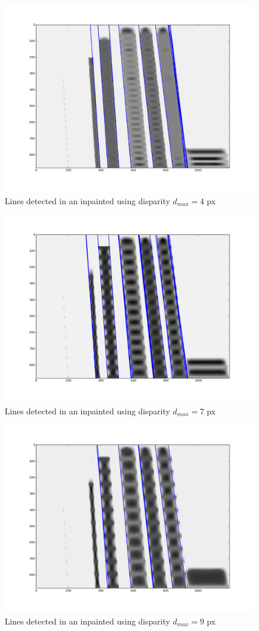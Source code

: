 \begin{itemize}
\begin{figure}[h!]
\centering
\includegraphics[width = 0.7 \textwidth]{./Diagrams/results/Disparity_benchmark/673_10_102_4_48_8_lines.png}
\caption{Lines detected in an inpainted using disparity $d_{max} = 4$ px}
\label{fig:first_lines_disparity}
\end{figure}

\begin{figure}[h!]
\centering
\includegraphics[width = 0.7 \textwidth]{./Diagrams/results/Disparity_benchmark/673_10_102_7_48_8_lines.png}
\caption{Lines detected in an inpainted using disparity $d_{max} = 7$ px}
\label{fig:second_lines_disparity}
\end{figure}

\begin{figure}[h!]
\centering
\includegraphics[width = 0.7 \textwidth]{./Diagrams/results/Disparity_benchmark/673_10_102_9_48_8_lines.png}
\caption{Lines detected in an inpainted using disparity $d_{max} = 9$ px}
\label{fig:third_lines_disparity}
\end{figure}


\end{itemize}
